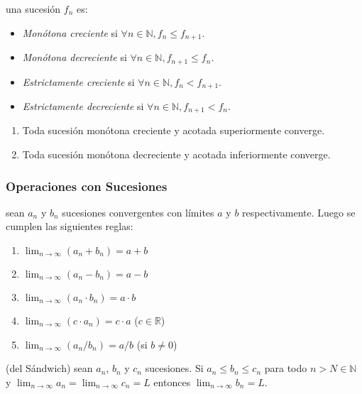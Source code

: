 \Definicion una sucesión \(f_n\) es:

\begin{itemize}
\tightlist
\item
  \emph{Monótona creciente} si
  \(\forall n \in \ensuremath{\mathbb{N}}, f_n \leq f_{n+1}\).
\item
  \emph{Monótona decreciente} si
  \(\forall n \in \ensuremath{\mathbb{N}}, f_{n+1} \leq f_n\).
\item
  \emph{Estrictamente creciente} si
  \(\forall n \in \ensuremath{\mathbb{N}}, f_n < f_{n+1}\).
\item
  \emph{Estrictamente decreciente} si
  \(\forall n \in \ensuremath{\mathbb{N}}, f_{n+1} < f_n\).
\end{itemize}

\Teorema 

\begin{enumerate}
\def\labelenumi{\arabic{enumi}.}
\tightlist
\item
  Toda sucesión monótona creciente y acotada superiormente converge.
\item
  Toda sucesión monótona decreciente y acotada inferiormente converge.
\end{enumerate}

\hypertarget{operaciones-con-sucesiones}{%
\subsubsection{Operaciones con
Sucesiones}\label{operaciones-con-sucesiones}}

\Teorema sean \(a_n\) y \(b_n\) sucesiones convergentes con límites
\(a\) y \(b\) respectivamente. Luego se cumplen las siguientes reglas:

\begin{enumerate}
\def\labelenumi{\arabic{enumi}.}
\tightlist
\item
  \(\ensuremath{\lim_{n \to \infty} (a_n + b_n)} = a + b\)
\item
  \(\ensuremath{\lim_{n \to \infty} (a_n - b_n)} = a - b\)
\item
  \(\ensuremath{\lim_{n \to \infty} (a_n \cdot b_n)} = a \cdot b\)
\item
  \(\ensuremath{\lim_{n \to \infty} (c \cdot a_n)} = c \cdot a\)
  (\(c \in \mathbb{R}\))
\item
  \(\ensuremath{\lim_{n \to \infty} (a_n / b_n)} = a / b\) (si
  \(b \neq 0\))
\end{enumerate}

\Teorema (del Sándwich) sean \(a_n\), \(b_n\) y \(c_n\) sucesiones. Si
\(a_n \leq b_n \leq c_n\) para todo
\(n > N \in \ensuremath{\mathbb{N}}\) y
\(\ensuremath{\lim_{n \to \infty} a_n} = \ensuremath{\lim_{n \to \infty} c_n} = L\)
entonces \(\ensuremath{\lim_{n \to \infty} b_n} = L\).

